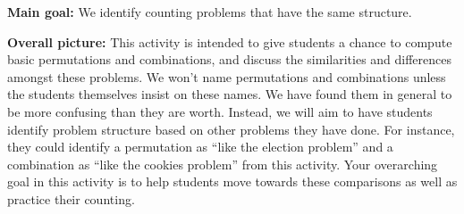 \documentclass[nooutcomes, noauthor]{ximera}
\begin{document}
\begin{instructorNotes}

{\bf Main goal:} We identify counting problems that have the same structure.

{\bf Overall picture:}  This activity is intended to give students a chance to compute basic permutations and combinations, and discuss the similarities and differences amongst these problems. We won't name permutations and combinations unless the students themselves insist on these names. We have found them in general to be more confusing than they are worth. Instead, we will aim to have students identify problem structure based on other problems they have done. For instance, they could identify a permutation as ``like the election problem'' and a combination as ``like the cookies problem'' from this activity. Your overarching goal in this activity is to help students move towards these comparisons as well as practice their counting.


\end{instructorNotes}
\end{document}
